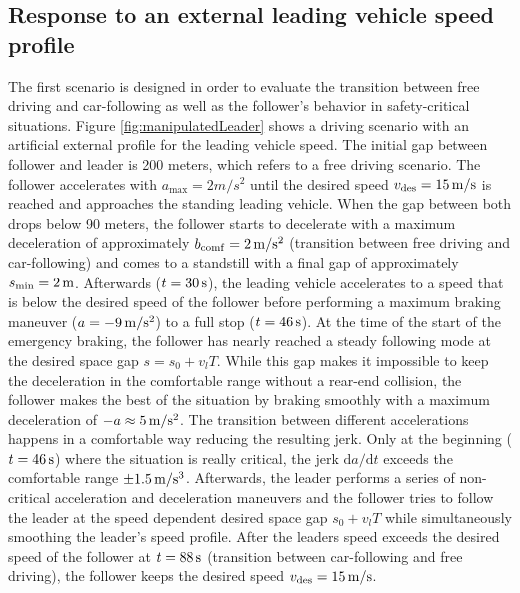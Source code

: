 \documentclass[review]{elsarticle}
\providecommand{\sub}[1]{_{\mathrm{#1}}}  %
\providecommand{\3}{{\ss}}
\begin{document}
\subsection{Response to an external leading vehicle speed profile}
The first scenario is designed in order to evaluate the transition between free driving and car-following as well as the follower's behavior in safety-critical situations. 
Figure \ref{fig:manipulatedLeader} shows a driving scenario with an
artificial external profile for the leading vehicle speed. The initial
gap between 
follower and leader is 200 meters, which refers to a free driving
scenario. The follower accelerates with $a\sub{max} = 2m/s^2$ until
the desired speed $v\sub{des} = \unit[15]{m/s} $ is reached and approaches
the standing leading vehicle. When the gap between both drops below 90
meters, the follower starts to decelerate with a maximum
  deceleration of approximately $b_{\rm
  comf} = \unit[2]{m/s^2}$ (transition between free driving and car-following)
and comes to a standstill with a final gap of approximately 
$s\sub{min} = \unit[2]{m}$. Afterwards ($t=\unit[30]{s}$),  the leading vehicle accelerates to a speed
that is below the desired speed of the follower before performing a
maximum braking maneuver ($a=\unit[-9]{m/s^2}$) to a full stop ($t=\unit[46]{s}$). At the time of the start of the
  emergency braking, the follower has nearly reached a steady
  following mode at the desired space gap $s=s_0+v_l T$. While this
  gap makes it impossible to keep the deceleration in the comfortable
  range without a rear-end collision, the follower makes the best of
  the situation by braking smoothly with a maximum deceleration of $-a
  \approx \unit[5]{m/s^2}$.  The transition between different
accelerations happens in a comfortable way reducing the resulting
jerk. Only at the beginning ($t=\unit[46]{s}$) where the situation is
really critical, the jerk $\text{d}a/\text{d}t$ exceeds the comfortable range 
$\pm \unit[1.5]{m/s^3}$. Afterwards, the leader performs a series of
non-critical acceleration and deceleration maneuvers and the follower
tries to follow the leader at the speed dependent desired space gap
$s_0+v_lT$ while simultaneously smoothing the leader's speed profile. After the leaders speed exceeds the desired speed of the follower at $t=\unit[88]{s}$ (transition between car-following and free driving), the follower keeps the desired speed $v\sub{des} = \unit[15]{m/s} $.
\end{document}
